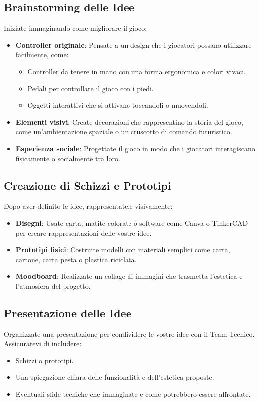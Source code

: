 \documentclass[a4paper,12pt]{report}
\begin{document}
\subsection{Brainstorming delle Idee}
Iniziate immaginando come migliorare il gioco:
\begin{itemize}
    \item \textbf{Controller originale}: Pensate a un design che i giocatori possano utilizzare facilmente, come:
    \begin{itemize}
        \item Controller da tenere in mano con una forma ergonomica e colori vivaci.
        \item Pedali per controllare il gioco con i piedi.
        \item Oggetti interattivi che si attivano toccandoli o muovendoli.
    \end{itemize}
    \item \textbf{Elementi visivi}: Create decorazioni che rappresentino la storia del gioco, come un'ambientazione spaziale o un cruscotto di comando futuristico.
    \item \textbf{Esperienza sociale}: Progettate il gioco in modo che i giocatori interagiscano fisicamente o socialmente tra loro.
\end{itemize}

\subsection{Creazione di Schizzi e Prototipi}
Dopo aver definito le idee, rappresentatele visivamente:
\begin{itemize}
    \item \textbf{Disegni}: Usate carta, matite colorate o software come Canva o TinkerCAD per creare rappresentazioni delle vostre idee.
    \item \textbf{Prototipi fisici}: Costruite modelli con materiali semplici come carta, cartone, carta pesta o plastica riciclata.
    \item \textbf{Moodboard}: Realizzate un collage di immagini che trasmetta l'estetica e l'atmosfera del progetto.
\end{itemize}

\subsection{Presentazione delle Idee}
Organizzate una presentazione per condividere le vostre idee con il Team Tecnico. Assicuratevi di includere:
\begin{itemize}
    \item Schizzi o prototipi.
    \item Una spiegazione chiara delle funzionalit\`a e dell'estetica proposte.
    \item Eventuali sfide tecniche che immaginate e come potrebbero essere affrontate.
\end{itemize}
\end{document}
